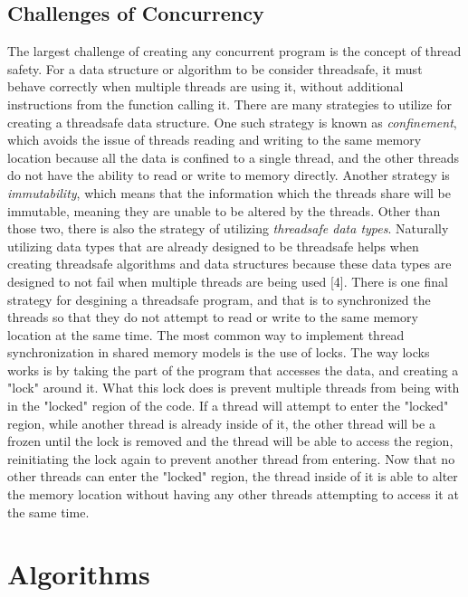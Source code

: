 \documentclass[conference]{IEEEtran}
\begin{document}
\subsection{Challenges of Concurrency}
The largest challenge of creating any concurrent program is the concept of thread safety. For a data structure or algorithm to be consider threadsafe, it 
must behave correctly when multiple threads are using it, without additional instructions from the function calling it. There are many strategies to utilize for
creating a threadsafe data structure. One such strategy is known as \emph{confinement}, which avoids the issue of threads reading and writing to the same
memory location because all the data is confined to a single thread, and the other threads do not have the ability to read or write to memory directly.
Another strategy is \emph{immutability}, which means that the information which the threads share will be immutable, meaning they are unable to be altered by
the threads. Other than those two, there is also the strategy of utilizing \emph{threadsafe data types}. Naturally utilizing data types that are already designed
to be threadsafe helps when creating threadsafe algorithms and data structures because these data types are designed to not fail when multiple threads are being used
[4]. There is one final strategy for desgining a threadsafe program, and that is to synchronized the threads so that they do not attempt to read or write to the same
memory location at the same time. The most common way to implement thread synchronization in shared memory models is the use of locks. The way locks works is by taking
the part of the program that accesses the data, and creating a "lock" around it. What this lock does is prevent multiple threads from being with in the "locked" region
of the code. If a thread will attempt to enter the "locked" region, while another thread is already inside of it, the other thread will be a frozen 
until the lock is removed and the thread will be able to access the region, reinitiating the lock again to prevent another thread from entering. Now that no other threads
can enter the "locked" region, the thread inside of it is able to alter the memory location without having any other threads attempting to access it at the same time.

\section{Algorithms}
\end{document}
